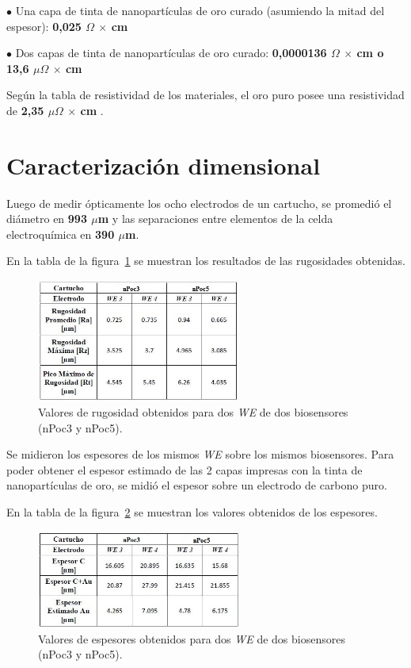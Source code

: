 $\bullet$ Una capa de tinta de nanopartículas de oro curado (asumiendo la mitad del espesor): \textbf{0,025 $\Omega$ $\times$ cm}

$\bullet$ Dos capas de tinta de nanopartículas de oro curado: \textbf{0,0000136 $\Omega$ $\times$ cm o 13,6 $\mu\Omega$ $\times$ cm}


Según la tabla de resistividad de los materiales, el oro puro posee una resistividad de \textbf{2,35 $\mu\Omega$ $\times$ cm} \cite{Resistividad}.

\section{Caracterización dimensional}
Luego de medir ópticamente los ocho electrodos de un cartucho, se promedió el diámetro en \textbf{993 $\mu$m} y las separaciones entre elementos de la celda electroquímica en \textbf{390 $\mu$m}.

En la tabla de la figura~\ref{fig:Figura_tabla_rugosidades} se muestran los resultados de las rugosidades obtenidas.

\begin{figure}[H]
  \centering
    \includegraphics[width=0.6\textwidth]{Figuras/Figura_tabla_rugosidades}
  \caption{Valores de rugosidad obtenidos para dos \emph{WE} de dos biosensores (nPoc3 y nPoc5).}
  \label{fig:Figura_tabla_rugosidades}
\end{figure}

Se midieron los espesores de los mismos \emph{WE} sobre los mismos biosensores. Para poder obtener el espesor estimado de las 2 capas impresas con la tinta de nanopartículas de oro, se midió el espesor sobre un electrodo de carbono puro.

En la tabla de la figura~\ref{fig:Figura_tabla_espesores} se muestran los valores obtenidos de los espesores.

\begin{figure}[H]
  \centering
    \includegraphics[width=0.6\textwidth]{Figuras/Figura_tabla_espesores}
  \caption{Valores de espesores obtenidos para dos \emph{WE} de dos biosensores (nPoc3 y nPoc5).}
  \label{fig:Figura_tabla_espesores}
\end{figure}

